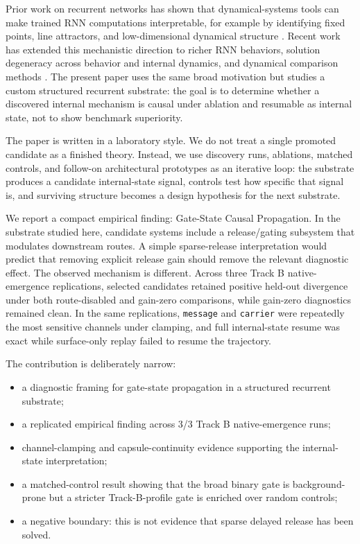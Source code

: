 \documentclass[11pt]{article}
\begin{document}
Prior work on recurrent networks has shown that dynamical-systems tools can
make trained RNN computations interpretable, for example by identifying fixed
points, line attractors, and low-dimensional dynamical structure
\citep{maheswaranathan2019lineattractor}. Recent work has extended this
mechanistic direction to richer RNN behaviors, solution degeneracy across
behavior and internal dynamics, and dynamical comparison methods
\citep{torre2025hmm,huang2024degeneracy,guilhot2024dsa}. The present paper
uses the same broad motivation but studies a custom structured recurrent
substrate: the goal is to determine whether a discovered internal mechanism is
causal under ablation and resumable as internal state, not to show benchmark
superiority.

The paper is written in a laboratory style. We do not treat a single promoted
candidate as a finished theory. Instead, we use discovery runs, ablations,
matched controls, and follow-on architectural prototypes as an iterative loop:
the substrate produces a candidate internal-state signal, controls test how
specific that signal is, and surviving structure becomes a design hypothesis
for the next substrate.

We report a compact empirical finding: Gate-State Causal Propagation. In the
substrate studied here, candidate systems include a release/gating subsystem
that modulates downstream routes. A simple sparse-release interpretation would
predict that removing explicit release gain should remove the relevant diagnostic
effect. The observed mechanism is different. Across three Track B
native-emergence replications, selected candidates retained positive
held-out divergence under both route-disabled and gain-zero comparisons, while
gain-zero diagnostics remained clean. In the same replications,
\texttt{message} and \texttt{carrier} were repeatedly the most sensitive
channels under clamping, and full internal-state resume was exact while
surface-only replay
failed to resume the trajectory.

The contribution is deliberately narrow:

\begin{itemize}
  \item a diagnostic framing for gate-state propagation in a structured
  recurrent substrate;
  \item a replicated empirical finding across 3/3 Track B native-emergence
  runs;
  \item channel-clamping and capsule-continuity evidence supporting the
  internal-state interpretation;
  \item a matched-control result showing that the broad binary gate is
  background-prone but a stricter Track-B-profile gate is enriched over random
  controls;
  \item a negative boundary: this is not evidence that sparse delayed release
  has been solved.
\end{itemize}
\end{document}
